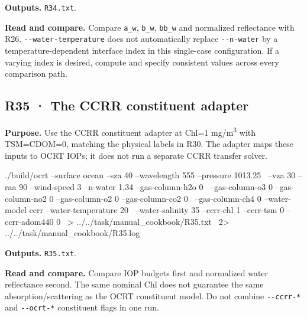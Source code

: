 \textbf{Outputs. }\texttt{R34.txt}.

\textbf{Read and compare. }Compare \texttt{a\_\allowbreak{}w}, \texttt{b\_\allowbreak{}w}, \texttt{bb\_\allowbreak{}w} and normalized reflectance with R26. \texttt{-\allowbreak{}-\allowbreak{}water-\allowbreak{}temperature} does not automatically replace \texttt{-\allowbreak{}-\allowbreak{}n-\allowbreak{}water} by a temperature-dependent interface index in this single-case configuration. If a varying index is desired, compute and specify consistent values across every comparison path.


\subsection{R35 · The CCRR constituent adapter}
\label{sec:auto:09_cookbook:6.10}

\label{recipe:R35}

\textbf{Purpose. }Use the CCRR constituent adapter at Chl=1 mg/m\textsuperscript{3} with TSM=CDOM=0, matching the physical labels in R30. The adapter maps these inputs to OCRT IOPs; it does not run a separate CCRR transfer solver.

\noindent\begin{minipage}{\linewidth}
\begin{ManualCode}

./build/ocrt --surface ocean --sza 40 --wavelength 555 --pressure 1013.25 \
  --vza 30 --raa 90 --wind-speed 3 --n-water 1.34 --gas-column-h2o 0 \
  --gas-column-o3 0 --gas-column-no2 0 --gas-column-o2 0 --gas-column-co2 0 \
  --gas-column-ch4 0 --water-model ccrr --water-temperature 20 \
  --water-salinity 35 --ccrr-chl 1 --ccrr-tsm 0 --ccrr-adom440 0 \
  > ../../task/manual_cookbook/R35.txt \
  2> ../../task/manual_cookbook/R35.log

\end{ManualCode}
\end{minipage}\par

\textbf{Outputs. }\texttt{R35.txt}.

\textbf{Read and compare. }Compare IOP budgets first and normalized water reflectance second. The same nominal Chl does not guarantee the same absorption/scattering as the OCRT constituent model. Do not combine \texttt{-\allowbreak{}-\allowbreak{}ccrr-\allowbreak{}*} and \texttt{-\allowbreak{}-\allowbreak{}ocrt-\allowbreak{}*} constituent flags in one run.

